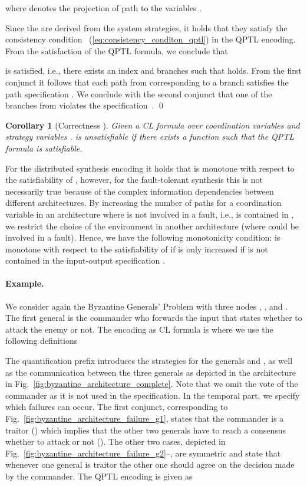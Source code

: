 \documentclass{LMCS}
\theoremstyle{plain}\newtheorem{theorem}[thm]{Theorem}
\theoremstyle{plain}\newtheorem{lemma}[thm]{Lemma}
\theoremstyle{plain}\newtheorem{proposition}[thm]{Proposition}
\theoremstyle{plain}\newtheorem{corollary}[thm]{Corollary}
\theoremstyle{definition}\newtheorem{definition}{Definition}[section]
\begin{document}
  where  denotes the projection of path  to the variables .
  
  Since the  are derived from the system strategies, it holds that they satisfy the consistency condition ~(\ref{eq:consistency_conditon_qptl}) in the QPTL encoding.
  From the satisfaction of the QPTL formula, we conclude that
  
   is satisfied, i.e., there exists an index  and branches  such that  holds.
  From the first conjunct it follows that each path  from  corresponding to a branch  satisfies the path specification .
  We conclude with the second conjunct that one of the branches from  violates the specification~.
\qed

\begin{corollary}[Correctness ] \label{thm:correctness_unsatii}
  Given a CL formula  over coordination variables  and strategy variables .
   is unsatisfiable if there exists a function  such that the QPTL formula  is satisfiable.
\end{corollary}

\begin{rem}[Monotonicity of ]
  For the distributed synthesis encoding it holds that  is monotone with respect to the satisfiability of , however, for the fault-tolerant synthesis this is not necessarily true because of the complex information dependencies between different architectures.
  By increasing the number of paths for a coordination variable  in an architecture  where  is not involved in a fault, i.e.,  is contained in , we restrict the choice of the environment in another architecture (where  could be involved in a fault).
  Hence, we have the following monotonicity condition:  is monotone with respect to the satisfiability of  if  is only increased if  is not contained in the input-output specification .
\end{rem}


\paragraph{\bf Example.} \label{sec:qptl_translation_example}
We consider again the Byzantine Generals' Problem with three nodes , , and .
The first general is the commander who forwards the input  that states whether to attack the enemy or not.
The encoding as CL formula is
\noindent
where we use the following definitions

The quantification prefix introduces the strategies for the generals  and , as well as the communication between the three generals as depicted in the architecture in Fig.~\ref{fig:byzantine_architecture_complete}.
Note that we omit the vote of the commander  as it is not used in the specification.
In the temporal part, we specify which failures can occur.
The first conjunct, corresponding to Fig.~\ref{fig:byzantine_architecture_failure_g1}, states that the commander is a traitor () which implies that the other two generals have to reach a consensus whether to attack or not ().
The other two cases, depicted in Fig.~\ref{fig:byzantine_architecture_failure_g2}--, are symmetric and state that whenever one general is traitor the other one should agree on the decision made by the commander.
The QPTL encoding  is given as
\end{document}
